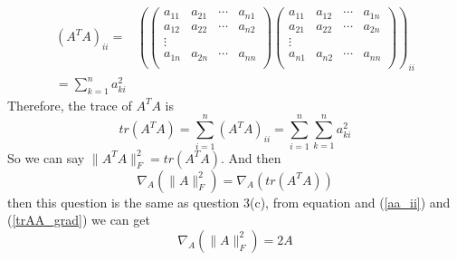 \documentclass[12pt]{article}
\begin{document}
	\begin{equation}\label{aTa}
	\begin{split}
	(A^TA)_{ii}=&
	\left(  
	\left(  
	\begin{array}{cccc}
	a_{11} & a_{21} & \cdots & a_{n1}\\
	a_{12} & a_{22} & \cdots & a_{n2}\\
	\vdots \\
	a_{1n} & a_{2n} & \cdots & a_{nn}\\
	\end{array}
	\right)
	\left(  
	\begin{array}{cccc}
	a_{11} & a_{12} & \cdots & a_{1n}\\
	a_{21} & a_{22} & \cdots & a_{2n}\\
	\vdots \\
	a_{n1} & a_{n2} & \cdots & a_{nn}\\
	\end{array}
	\right)
	\right)_{ii} \\
	=\sum_{k=1}^n a^2_{ki}
	\end{split}
	\end{equation}
	Therefore, the trace of $A^TA$ is 
	\begin{equation}\label{trace_aTa}
	tr(A^TA) = \sum_{i=1}^n (A^TA)_{ii}=\sum_{i=1}^n\sum_{k=1}^n a^2_{ki}
	\end{equation}
	So we can say $\lVert A^TA\rVert_F^2=tr(A^TA)$. And then
	\begin{equation}\label{trAA_from}
	\nabla_A(\lVert A\rVert_F^2)=\nabla_A(tr(A^TA))
	\end{equation}
	then this question is the same as question 3(c), from equation and (\ref{aa_ii}) and (\ref{trAA_grad})
	we can get
	\begin{equation}\label{trAA_from_final}
	\nabla_A(\lVert A\rVert_F^2)=2A
	\end{equation}
	
	
\end{document}
